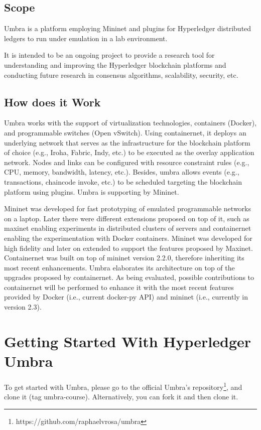 \documentclass[12pt,a4paper]{article}
\theoremstyle{definition}
\begin{document}
\subsection{Scope}
Umbra is a platform employing Mininet and plugins for Hyperledger distributed ledgers to run under emulation in a lab environment.

It is intended to be an ongoing project to provide a research tool for understanding and improving the Hyperledger blockchain platforms and conducting future research in consensus algorithms, scalability, security, etc.


\subsection{How does it Work}


Umbra works with the support of virtualization technologies, containers (Docker), and programmable switches (Open vSwitch). Using containernet, it deploys an underlying network that serves as the infrastructure for the blockchain platform of choice (e.g., Iroha, Fabric, Indy, etc.) to be executed as the overlay application network. Nodes and links can be configured with resource constraint rules (e.g., CPU, memory, bandwidth, latency, etc.). Besides, umbra allows events (e.g., transactions, chaincode invoke, etc.) to be scheduled targeting the blockchain platform using plugins. Umbra is supporting by Mininet.

Mininet was developed for fast prototyping of emulated programmable networks on a laptop. Later there were different extensions proposed on top of it, such as maxinet enabling experiments in distributed clusters of servers and containernet enabling the experimentation with Docker containers. Mininet was developed for high fidelity and later on extended to support the features proposed by Maxinet. Containernet was built on top of mininet version 2.2.0, therefore inheriting its most recent enhancements. Umbra elaborates its architecture on top of the upgrades proposed by containernet. As being evaluated, possible contributions to containernet will be performed to enhance it with the most recent features provided by Docker (i.e., current docker-py API) and mininet (i.e., currently in version 2.3).


\section{Getting Started With Hyperledger Umbra}
To get started with Umbra, please go to the official Umbra's repository\footnote{https://github.com/raphaelvrosa/umbra}, and clone it (tag umbra-course). Alternatively, you can fork it and then clone it.
\end{document}
